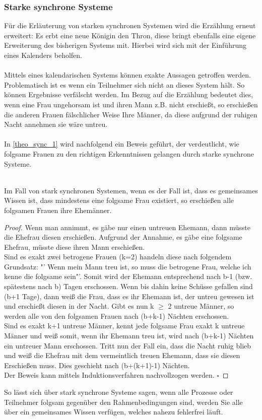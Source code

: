 \subsubsection{Starke synchrone Systeme}
\label{stark_sync_wissen}
Für die Erläuterung von starken synchronen Systemen wird die Erzählung erneut erweitert: Es erbt eine neue Königin den Thron, diese bringt ebenfalls eine eigene Erweiterung des bisherigen Systems mit. Hierbei wird sich mit der Einführung eines Kalenders beholfen.\\\\ 
Mittels eines kalendarischen Systems können exakte Aussagen getroffen werden. Problematisch ist es wenn ein Teilnehmer sich nicht an dieses System hält. So können Ergebnisse verfälscht werden. Im Bezug auf die Erzählung bedeutet dies, wenn eine Frau ungehorsam ist und ihren Mann z.B. nicht erschießt, so erschießen die anderen Frauen fälschlicher Weise Ihre Männer, da diese aufgrund der ruhigen Nacht annehmen sie wäre untreu.\\\\
In \ref{theo_sync_1} wird nachfolgend ein Beweis geführt, der verdeutlicht, wie folgsame Frauen zu den richtigen Erkenntnissen gelangen durch starke synchrone Systeme. 
\begin{theorem}\\
\label{theo_sync_1}
Im Fall von stark synchronen Systemen, wenn es der Fall ist, dass es gemeinsames Wissen ist, dass mindestens eine folgsame Frau existiert, so erschießen alle folgsamen Frauen ihre Ehemänner.
\end{theorem}
\begin{proof}
Wenn man annimmt, es gäbe nur einen untreuen Ehemann, dann müsste die Ehefrau diesen erschießen. Aufgrund der Annahme, es gäbe eine folgsame Ehefrau, müsste diese ihren Mann erschießen.\\
Sind es exakt zwei betrogene Frauen (k=2) handeln diese nach folgendem Grundsatz: "' Wenn mein Mann treu ist, so muss die betrogene Frau, welche ich kenne die folgsame sein"'. Somit wird der Ehemann entsprechend nach b-1 (bzw. spätestens nach b) Tagen erschossen. Wenn bis dahin keine Schüsse gefallen sind (b+1 Tage), dann weiß die Frau, dass es ihr Ehemann ist, der untreu gewesen ist und erschießt diesen in der Nacht. Gibt es nun k $\geq$ 2 untreue Männer, so werden alle von den folgsamen Frauen nach (b+k-1) Nächten erschossen.\\
Sind es exakt k+1 untreue Männer, kennt jede folgsame Frau exakt k untreue Männer und weiß somit, wenn ihr Ehemann treu ist, wird  nach (b+k-1) Nächten ein untreuer Mann erschossen. Tritt nun der Fall ein, dass die Nacht ruhig blieb und weiß die Ehefrau mit dem vermeintlich treuen Ehemann, dass sie diesen Erschießen muss. Dies geschieht nach (b+(k+1)-1) Nächten. \\ Der Beweis kann mittels Induktionsverfahren nachvollzogen werden.
$\square$
\end{proof}
So lässt sich über stark synchrone Systeme sagen, wenn alle Prozesse oder Teilnehmer folgsam gegenüber den Rahmenbedingungen sind, werden Sie alle über ein gemeinsames Wissen verfügen, welches nahezu fehlerfrei läuft.